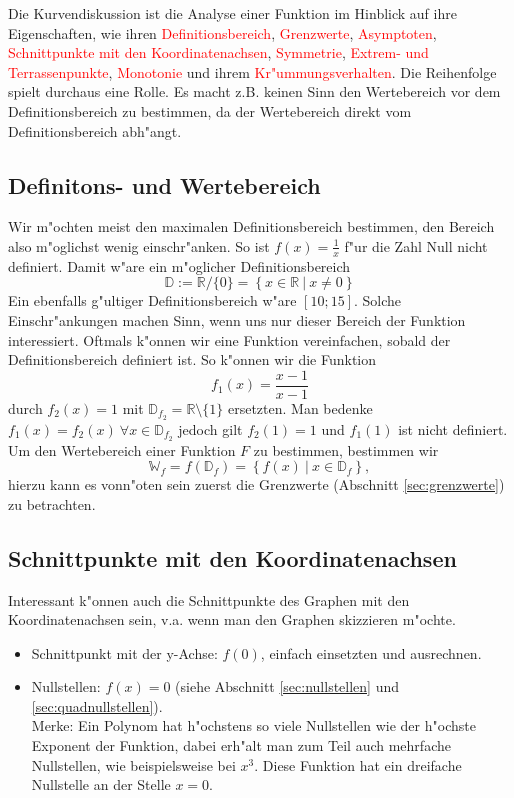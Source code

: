 Die Kurvendiskussion ist die Analyse einer Funktion im Hinblick auf ihre Eigenschaften, wie ihren \textcolor{red}{Definitionsbereich}, \textcolor{red}{Grenzwerte}, \textcolor{red}{Asymptoten}, \textcolor{red}{Schnittpunkte mit den Koordinatenachsen}, \textcolor{red}{Symmetrie}, \textcolor{red}{Extrem- und Terrassenpunkte}, \textcolor{red}{Monotonie} und ihrem \textcolor{red}{Kr"ummungsverhalten}. Die Reihenfolge spielt durchaus eine Rolle. Es macht z.B. keinen Sinn den Wertebereich vor dem Definitionsbereich zu bestimmen, da der Wertebereich direkt vom Definitionsbereich abh"angt.

\subsection{Definitons- und Wertebereich}
Wir m"ochten meist den maximalen Definitionsbereich bestimmen, den Bereich also m"oglichst wenig einschr"anken. So ist $f(x) = \frac{1}{x}$ f"ur die Zahl Null nicht definiert. Damit w"are ein m"oglicher Definitionsbereich 
\begin{equation*}
\mathbb{D} := \mathbb{R}/\{0\} = \left\{x \in \mathbb{R} \ | \ x \neq 0 \right\}
\end{equation*}
Ein ebenfalls g"ultiger Definitionsbereich w"are $\left[10;15\right]$. Solche Einschr"ankungen machen Sinn, wenn uns nur dieser Bereich der Funktion interessiert. Oftmals k"onnen wir eine Funktion vereinfachen, sobald der Definitionsbereich definiert ist. So k"onnen wir die Funktion
\begin{equation*}
f_1(x) = \frac{x-1}{x-1}
\end{equation*}
durch $f_2(x) = 1$ mit $\mathbb{D}_{f_2} = \mathbb{R} \setminus \{1\}$ ersetzten. Man bedenke $f_1(x) = f_2(x) \ \forall x \in \mathbb{D}_{f_2}$ jedoch gilt $f_2(1) = 1$ und $f_1(1)$ ist nicht definiert. Um den Wertebereich einer Funktion $F$ zu bestimmen, bestimmen wir
\begin{equation*}
\mathbb{W}_f = f(\mathbb{D}_f) = \left\{f(x) \ | \ x \in \mathbb{D}_f \right\},
\end{equation*}
hierzu kann es vonn"oten sein zuerst die Grenzwerte (Abschnitt \ref{sec:grenzwerte}) zu betrachten.

\subsection{Schnittpunkte mit den Koordinatenachsen}
Interessant k"onnen auch die Schnittpunkte des Graphen mit den Koordinatenachsen sein, v.a. wenn man den Graphen skizzieren m"ochte.
\begin{itemize}
\item Schnittpunkt mit der y-Achse: $f(0)$, einfach einsetzten und ausrechnen.
\item Nullstellen: $f(x) = 0$ (siehe Abschnitt \ref{sec:nullstellen} und \ref{sec:quadnullstellen}).\\
Merke: Ein Polynom hat h"ochstens so viele Nullstellen wie der h"ochste Exponent der Funktion, dabei erh"alt man zum Teil auch mehrfache Nullstellen, wie beispielsweise bei $x^3$. Diese Funktion hat ein dreifache Nullstelle an der Stelle $x=0$.
\end{itemize}

